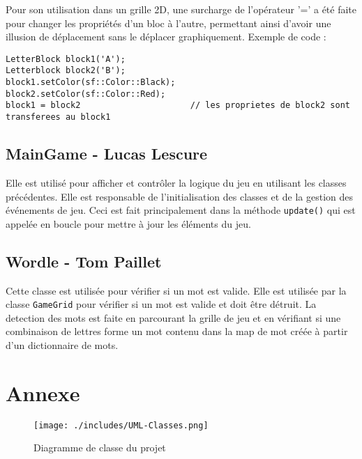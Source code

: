 \documentclass[11pt, openright]{book}
\begin{document}
        Pour son utilisation dans un grille 2D, une surcharge de l'opérateur '=' a été faite pour changer les propriétés d'un bloc à l'autre, permettant ainsi d'avoir une illusion de déplacement sans le déplacer graphiquement.
        Exemple de code :
        \begin{lstlisting}
LetterBlock block1('A');
Letterblock block2('B');
block1.setColor(sf::Color::Black);
block2.setColor(sf::Color::Red);
block1 = block2                      // les proprietes de block2 sont transferees au block1
            \end{lstlisting}

        \subsection{MainGame - Lucas Lescure}
        Elle est utilisé pour afficher et contrôler la logique du jeu en utilisant les classes précédentes. Elle est responsable de l'initialisation des classes et de la gestion des événements de jeu. Ceci est fait principalement dans la méthode \texttt{update()} qui est appelée en boucle pour mettre à jour les éléments du jeu. 

        \subsection{Wordle - Tom Paillet}

        Cette classe est utilisée pour vérifier si un mot est valide. Elle est utilisée par la classe \texttt{GameGrid} pour vérifier si un mot est valide et doit être détruit. La detection des mots est faite en parcourant la grille de jeu et en vérifiant si une combinaison de lettres forme un mot contenu dans la map de mot créée à partir d'un dictionnaire de mots.
     













    

    \newpage

    \section{Annexe}
    \label{sec::annexe}

     \begin{figure}[ht!]
        \centering
        \texttt{[image: ./includes/UML-Classes.png]}
        \caption{Diagramme de classe du projet}
    \end{figure}

    


            





        

        

        
\end{document}
